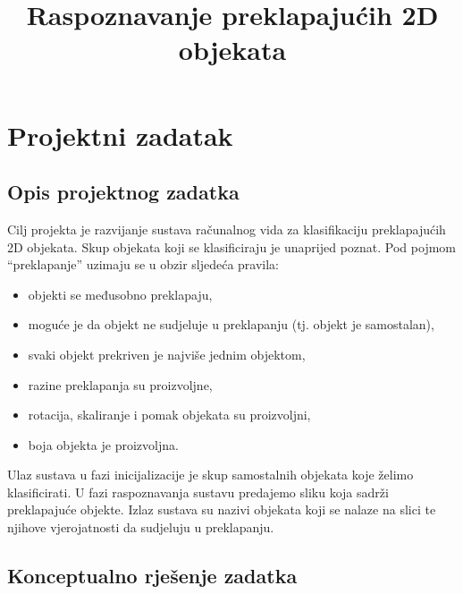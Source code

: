 \documentclass[10pt, a4paper]{article}
\title{Raspoznavanje preklapajućih 2D objekata}
\begin{document}
\maketitleabstract

\section{Projektni zadatak}

\subsection{Opis projektnog zadatka}

Cilj projekta je razvijanje sustava računalnog vida za klasifikaciju preklapajućih 2D objekata. Skup objekata koji se klasificiraju je unaprijed poznat. Pod pojmom “preklapanje” uzimaju se u obzir sljedeća pravila:
\begin{itemize}
\item objekti se međusobno preklapaju,
\item moguće je da objekt ne sudjeluje u preklapanju (tj. objekt je samostalan),
\item svaki objekt prekriven je najviše jednim objektom,
\item razine preklapanja su proizvoljne,
\item rotacija, skaliranje i pomak objekata su proizvoljni,
\item boja objekta je proizvoljna.
\end{itemize}
Ulaz sustava u fazi inicijalizacije je skup samostalnih objekata koje želimo klasificirati. U fazi raspoznavanja sustavu predajemo sliku koja sadrži preklapajuće objekte. Izlaz sustava su nazivi objekata koji se nalaze na slici te njihove vjerojatnosti da sudjeluju u preklapanju.

\subsection{Konceptualno rješenje zadatka}
\end{document}
